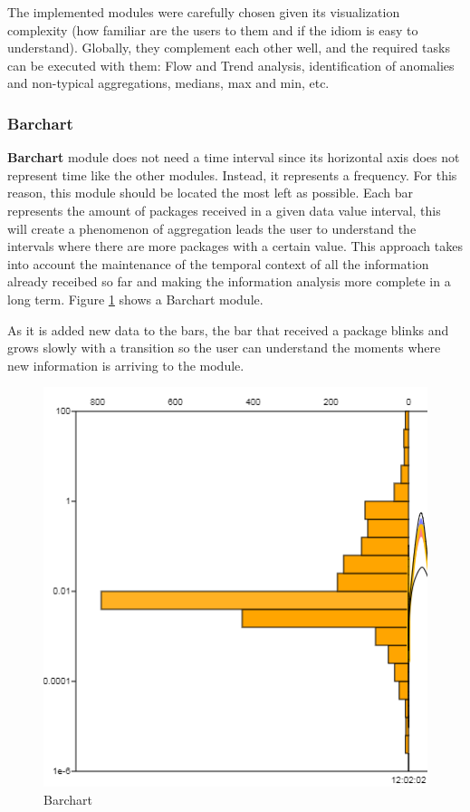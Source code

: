 \documentclass[letterpaper, 10 pt, conference]{ieeeconf}  %
\begin{document}
The implemented modules were carefully chosen given its visualization complexity (how familiar are the users to them and if the idiom is easy to understand). Globally, they complement each other well, and the required tasks can be executed with them: Flow and Trend analysis, identification of anomalies and non-typical aggregations, medians, max and min, etc.


\subsubsection{Barchart}
\label{subsubsection:barchart}
\textbf{Barchart} module does not need a time interval since its horizontal axis does not represent time like the other modules. Instead, it represents a frequency. For this reason, this module should be located the most left as possible. Each bar represents the amount of packages received in a given data value interval, this will create a phenomenon of aggregation leads the user to understand the intervals where there are more packages with a certain value. \newline 
This approach takes into account the maintenance of the temporal context of all the information already receibed so far and making the information analysis more complete in a long term. Figure \ref{fig:barchart} shows a Barchart module.

As it is added new data to the bars, the bar that received a package blinks and grows slowly with a transition so the user can understand the moments where new information is arriving to the module.

\begin{figure}[ht]
    \centering
    \includegraphics[width=0.8\linewidth]{Figures/barchart.png}
    \caption{Barchart}
        \label{fig:barchart}
\end{figure}
\end{document}
